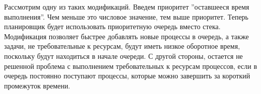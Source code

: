 Рассмотрим одну из таких модификаций. Введем приоритет ''оставшееся время выполнения''. Чем меньше это числовое значение, тем выше приоритет. Теперь планировщик будет использовать приоритетную очередь вместо стека. Модификация позволяет быстрее добавлять новые процессы в очередь, а также задачи, не требовательные к ресурсам, будут иметь низкое оборотное время, поскольку будут находиться в начале очереди. С другой стороны, остается не решенной проблема с выполнением требовательных к ресурсам процессов, если в очередь постоянно поступают процессы, которые можно завершить за короткий промежуток времени.
 